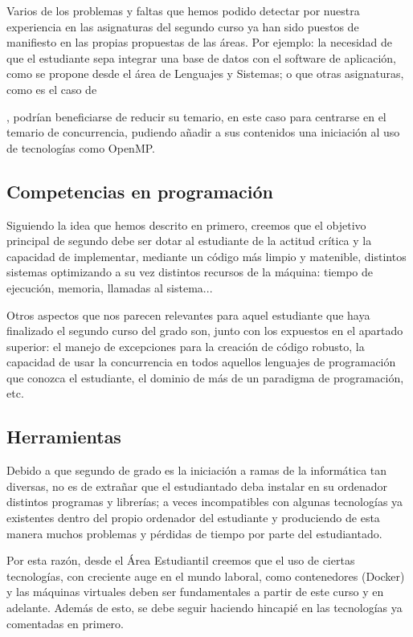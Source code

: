 Varios de los problemas y faltas que hemos podido detectar
por nuestra experiencia en las asignaturas del segundo curso
ya han sido puestos de manifiesto en las propias propuestas de las áreas.
Por ejemplo: la necesidad de que el estudiante sepa integrar una base de datos
con el software de aplicación,
como se propone desde el área de Lenguajes y Sistemas;
o que otras asignaturas,
como es el caso de \subject{Programación Concurrente y Distribuida},
podrían beneficiarse de reducir su temario,
en este caso para centrarse en el temario de concurrencia,
pudiendo añadir a sus contenidos
una iniciación al uso de tecnologías como OpenMP.

\subsection{Competencias en programación}

Siguiendo la idea que hemos descrito en primero,
creemos que el objetivo principal de segundo debe ser
dotar al estudiante de la actitud crítica y la capacidad de implementar,
mediante un código más limpio y matenible,
distintos sistemas optimizando a su vez distintos recursos de la máquina:
tiempo de ejecución, memoria, llamadas al sistema...

Otros aspectos que nos parecen relevantes
para aquel estudiante que haya finalizado el segundo curso del grado son,
junto con los expuestos en  el apartado superior:
el manejo de excepciones para la creación de código robusto,
la capacidad de usar la concurrencia
en todos aquellos lenguajes de programación que conozca el estudiante,
el dominio de más de un paradigma de programación, etc.

\subsection{Herramientas}

Debido a que segundo de grado es la iniciación a
ramas de la informática tan diversas,
no es de extrañar que el estudiantado deba
instalar en su ordenador distintos programas y librerías;
a veces incompatibles con algunas tecnologías
ya existentes dentro del propio ordenador del estudiante y
produciendo de esta manera muchos problemas y
pérdidas de tiempo por parte del estudiantado.

Por esta razón, desde el Área Estudiantil creemos que
el uso de ciertas tecnologías, con creciente auge en el mundo laboral,
como contenedores (Docker) y
las máquinas virtuales deben ser fundamentales
a partir de este curso y en adelante.
Además de esto, se debe seguir haciendo hincapié en
las tecnologías ya comentadas en primero.

